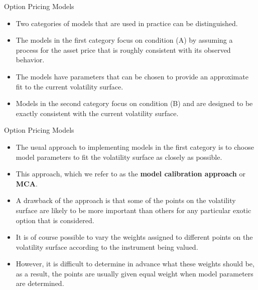 \documentclass[11pt]{beamer}
\begin{document}
\begin{frame}{Option Pricing Models}
	\begin{itemize}
\item	Two categories of models that are used in practice can be distinguished. 
\item The models in the first category focus on condition (A) by assuming a process for the asset price that is roughly consistent with its observed behavior. 
\item The models have parameters that can be chosen to provide an
approximate fit to the current volatility surface. 
\item Models in the second category focus on condition (B)
and are designed to be exactly consistent with the current volatility surface.
	\end{itemize}
\end{frame}
\begin{frame}{Option Pricing Models}
	\begin{itemize}
		\item The usual approach to implementing models in the first category is to choose model
parameters to fit the volatility surface as closely as possible. 
\item This approach, which we refer to as
the \textbf{model calibration approach} or \textbf{MCA}. 
\item A drawback of the approach is that some of the points on the volatility
surface are likely to be more important than others for any particular exotic option that is
considered. 
\item It is of course possible to vary the weights assigned to different points on the volatility
surface according to the instrument being valued. 
\item However, it is difficult to determine in advance
what these weights should be, as a result, the points are usually given equal weight when model
parameters are determined.

	\end{itemize}
\end{frame}

\end{document}
